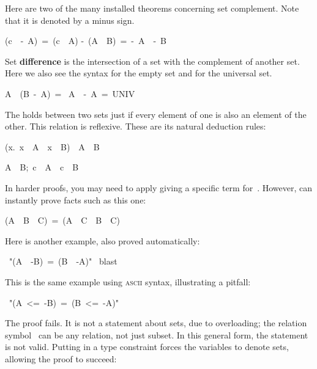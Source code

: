 Here are two of the many installed theorems concerning set
complement.%
Note that it is denoted by a minus sign.
\begin{isabelle}
(c\ \isasymin\ -\ A)\ =\ (c\ \isasymnotin\ A)
\isanewline
-\ (A\ \isasymunion\ B)\ =\ -\ A\ \isasyminter\ -\ B
\end{isabelle}

Set \textbf{difference} is the intersection
of a set with the  complement of another set. Here we also see the syntax
for the  empty set and for the universal set. 
\begin{isabelle}
A\ \isasyminter\ (B\ -\ A)\ =\ \isacharbraceleft\isacharbraceright
{}\isanewline
A\ \isasymunion\ -\ A\ =\ UNIV%
\end{isabelle}

The  holds between two sets just if every element 
of one is also an element of the other. This relation is reflexive.  These
are its natural deduction rules:
\begin{isabelle}
({\isasymAnd}x.\ x\ \isasymin\ A\ \isasymLongrightarrow\ x\ \isasymin\ B)\ \isasymLongrightarrow\ A\ \isasymsubseteq\ B%
%
\par\smallskip%
\isasymlbrakk A\ \isasymsubseteq\ B;\ c\ \isasymin\
A\isasymrbrakk\ \isasymLongrightarrow\ c\
\isasymin\ B%
\end{isabelle}
In harder proofs, you may need to apply  giving a specific term
for~\isa{c}.  However,  can instantly prove facts such as this
one: 
\begin{isabelle}
(A\ \isasymunion\ B\ \isasymsubseteq\ C)\ =\
(A\ \isasymsubseteq\ C\ \isasymand\ B\ \isasymsubseteq\ C)
\end{isabelle}
Here is another example, also proved automatically:
\begin{isabelle}
\ "(A\
\isasymsubseteq\ -B)\ =\ (B\ \isasymsubseteq\ -A)"\isanewline
\isacommand{by}\ blast
\end{isabelle}
%
This is the same example using \textsc{ascii} syntax, illustrating a pitfall: 
\begin{isabelle}
\ "(A\ <=\ -B)\ =\ (B\ <=\ -A)"
\end{isabelle}
%
The proof fails.  It is not a statement about sets, due to overloading;
the relation symbol~\isa{<=} can be any relation, not just  
subset. 
In this general form, the statement is not valid.  Putting
in a type constraint forces the variables to denote sets, allowing the
proof to succeed:

